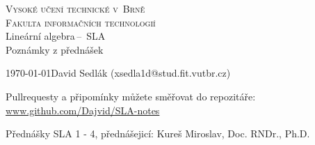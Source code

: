 \documentclass[a4paper, 11pt]{article}
\theoremstyle{break}
\begin{document}
\begin{titlepage}

	\begin{center}
		\textsc{\Huge Vysoké učení technické v~Brně}\\
				  \huge{\textsc{Fakulta informačních technologií}}\\
		{\LARGE 	Lineární algebra\,--\, SLA}\\
				{\Huge Poznámky z přednášek}
	\end{center}
	{\Large\today \hfill David Sedlák (xsedla1d@stud.fit.vutbr.cz)}

	\begin{center}
		Pullrequesty a připomínky můžete směřovat do repozitáře: \url{www.github.com/Dajvid/SLA-notes}
	\end{center}
\end{titlepage}

\tableofcontents







\newpage


\def\refname{Reference}
Přednášky SLA 1 - 4, přednášejicí: Kureš Miroslav, Doc. RNDr., Ph.D.
\end{document}
